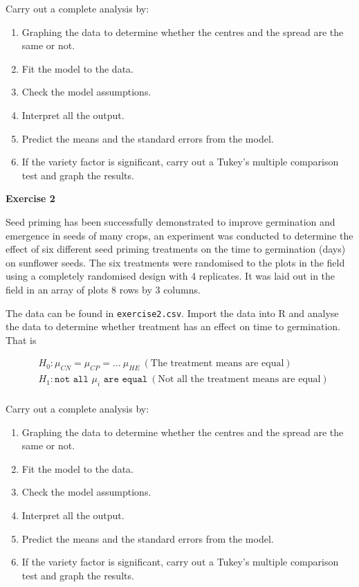 \documentclass[a4paper, 10pt, fleqn, twosided]{memoir}
\begin{document}
Carry out a complete analysis by:
\begin{enumerate}
  \item Graphing the data to determine whether the centres and the spread are the same or not.
  \item Fit the model to the data.
  \item Check the model assumptions.
  \item Interpret all the output.
  \item Predict the means and the standard errors from the model.
  \item If the variety factor is significant, carry out a Tukey's multiple comparison test and graph the results.
\end{enumerate}

\clearpage

\textbf{Exercise 2}

Seed priming has been successfully demonstrated to improve germination  and  emergence  in  seeds  of  many  crops, an
experiment was conducted to determine the effect of six different seed priming treatments on the time to germination
(days) on sunflower seeds. The six treatments were randomised to the plots in the field using a completely randomised
design with 4 replicates.  It was laid out in the field in an array of plots 8 rows by 3 columns.


The data can be found in \texttt{exercise2.csv}. Import the data into R and
analyse the data to determine whether treatment has an effect on time to
germination. That is

\begin{align*}
& H_0: \mu_{CN} = \mu_{CP} = \hdots \ \mu_{HE} \: (\text{The treatment means are equal})\\
& H_1: \texttt{not all } \mu_i \texttt{ are equal} \: (\text{Not all the treatment means are equal})\\
\end{align*}

Carry out a complete analysis by:
\begin{enumerate}
  \item Graphing the data to determine whether the centres and the spread are the same or not.
  \item Fit the model to the data.
  \item Check the model assumptions.
  \item Interpret all the output.
  \item Predict the means and the standard errors from the model.
  \item If the variety factor is significant, carry out a Tukey's multiple comparison test and graph the results.
\end{enumerate}
\end{document}
